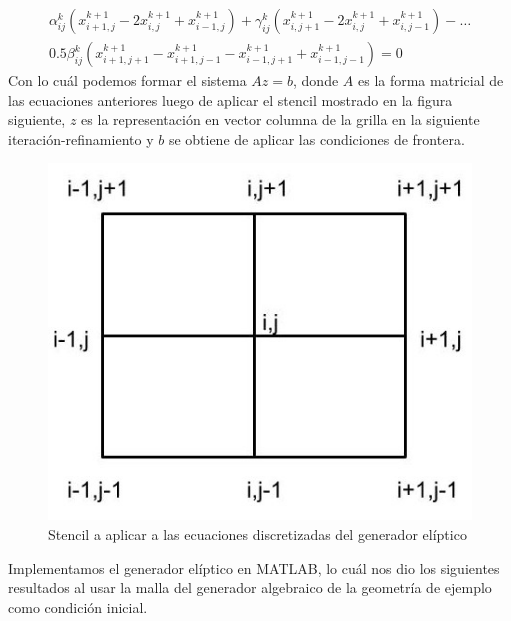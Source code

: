 \documentclass{article}
\begin{document}
\begin{enumerate}
\begin{itemize}
\begin{itemize}
		\begin{gather*}
			\alpha_{ij}^{k} ( x_{i+1,j}^{k+1} - 2 x_{i,j}^{k+1} + x_{i-1,j}^{k+1} ) + \gamma_{ij}^{k} ( x_{i, j + 1}^{k+1} - 2 x_{i, j}^{k+1} + x_{i,j-1}^{k+1} ) - \hdots \\
				 0.5 \beta_{ij}^{k} ( x_{i+1,j+1}^{k+1} - x_{i+1,j-1}^{k+1} - x_{i-1,j+1}^{k+1} + x_{i-1,j-1}^{k+1} ) = 0
		\end{gather*}
		Con lo cu\'al podemos formar el sistema $Az = b$, donde $A$ es la forma matricial de las ecuaciones anteriores luego de aplicar el stencil mostrado en la figura siguiente, $z$ es la representaci\'on en vector columna de la grilla en la siguiente iteraci\'on-refinamiento y $b$ se obtiene de aplicar las condiciones de frontera.
		\begin{figure}[H]
			\centering
			\includegraphics[scale=0.5]{./imgs/img_stencil.jpg}
			\caption{Stencil a aplicar a las ecuaciones discretizadas del generador el\'iptico}
			\label{fig:img_stencil}
		\end{figure}
		Implementamos el generador el\'iptico en MATLAB, lo cu\'al nos dio los siguientes resultados al usar la malla del generador algebraico de la geometr\'ia de ejemplo como condici\'on inicial.
		\begin{figure}[H]
			\centering

\end{figure}
\end{itemize}
\end{itemize}
\end{enumerate}
\end{document}
